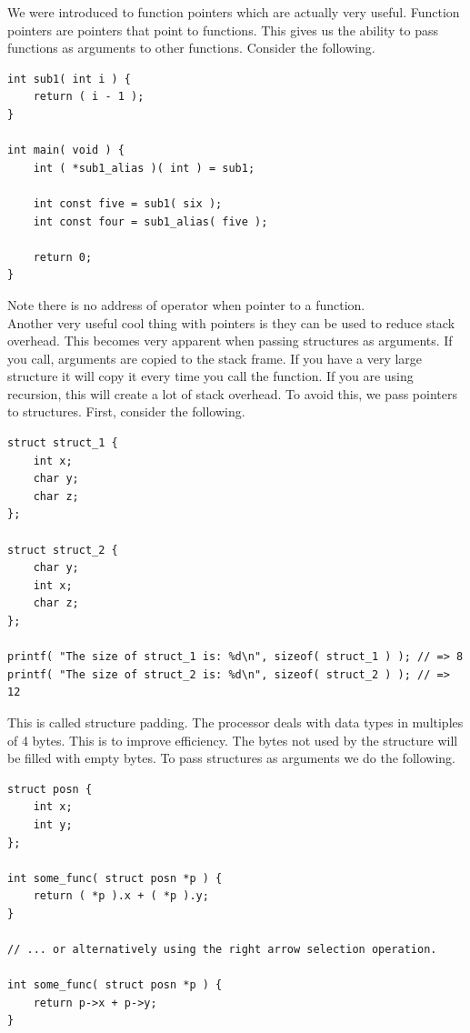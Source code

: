 \documentclass[12pt,extarticle]{article}
\begin{document}
We were introduced to function pointers which are actually very useful. Function pointers are pointers that point to functions. This gives us the ability to pass functions as arguments to other functions. Consider the following.\\

\lstset {
	language=c
}
\begin{lstlisting}
int sub1( int i ) {
	return ( i - 1 );
}

int main( void ) {
	int ( *sub1_alias )( int ) = sub1;
	
	int const five = sub1( six );
	int const four = sub1_alias( five );
	
	return 0;
}
\end{lstlisting}

Note there is no address of operator when pointer to a function.\\

Another very useful cool thing with pointers is they can be used to reduce stack overhead. This becomes very apparent when passing structures as arguments. If you call, arguments are copied to the stack frame. If you have a very large structure it will copy it every time you call the function. If you are using recursion, this will create a lot of stack overhead. To avoid this, we pass pointers to structures. First, consider the following.\\

\lstset {
	language=c
}
\begin{lstlisting}
struct struct_1 {
	int x;
	char y;
	char z;
};

struct struct_2 {
	char y;
	int x;
	char z;
};

printf( "The size of struct_1 is: %d\n", sizeof( struct_1 ) ); // => 8
printf( "The size of struct_2 is: %d\n", sizeof( struct_2 ) ); // => 12
\end{lstlisting}

This is called structure padding. The processor deals with data types in multiples of 4 bytes. This is to improve efficiency. The bytes not used by the structure will be filled with empty bytes. To pass structures as arguments we do the following.\\

\lstset {
	language=c
}
\begin{lstlisting}
struct posn {
	int x;
	int y;
};

int some_func( struct posn *p ) {
	return ( *p ).x + ( *p ).y;
}

// ... or alternatively using the right arrow selection operation.

int some_func( struct posn *p ) {
	return p->x + p->y;
}
\end{lstlisting}
\end{document}

